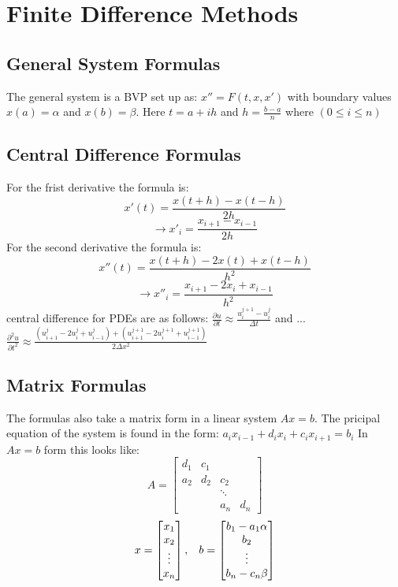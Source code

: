 \section{Finite Difference Methods}

\subsection*{General System Formulas}
The general system is a BVP set up as:
$ x'' = F(t, x, x')$ with boundary values $x(a) = \alpha$ and $x(b) = \beta$.
Here $t = a + ih$ and $h = \frac{b - a}{n}$ where $(0 \leq i \leq n)$
\subsection*{Central Difference Formulas}
For the frist derivative the formula is:
\[
x'(t) = \frac{x(t+h) - x(t-h)}{2h}
\]
\[
\rightarrow x'_{i} = \frac{x_{i+1} - x_{i-1}}{2h}
\]
For the second derivative the formula is:
\[
x''(t) = \frac{x(t+h) - 2 x(t) + x(t-h)}{h^2}
\]
\[
\rightarrow x''_{i} = \frac{x_{i+1} - 2 x_i + x_{i-1}}{h^2}
\]
central difference for PDEs are as follows:
$ \frac{\partial u}{\partial t} \approx \frac{u^{j+1}_i - u^{j}_i}{\Delta t}$
and ... \\
$ \frac{\partial^2 u}{\partial t^2} \approx \frac{ ( u^{j}_{i+1} -2 u^{j}_{i} + u^{j}_{i-1} ) + ( u^{j+1}_{i+1} -2 u^{j+1}_{i} + u^{j+1}_{i-1} ) }{2 \Delta x^2}$

\subsection*{Matrix Formulas}
The formulas also take a matrix form in a linear system $A x = b$.
The pricipal equation of the system is found in the form:
\newline
$a_i x_{i-1} + d_i x_{i} + c_i x_{i+1} = b_i$
\newline
In $Ax = b$ form this looks like:
\[
A =
\begin{bmatrix}
  d_1 & c_1 & &  \\
  a_2 & d_2 & c_2 &  \\
  & & \ddots &  \\
  & &  a_n & d_n
\end{bmatrix}
\]
\[
x =
\begin{bmatrix}
x_1 \\
x_2 \\
\vdots \\
x_n
\end{bmatrix}
, \hspace{3mm}
b =
\begin{bmatrix}
b_1 - a_1 \alpha \\
b_2 \\
\vdots \\
b_n - c_n \beta
\end{bmatrix}
\]

